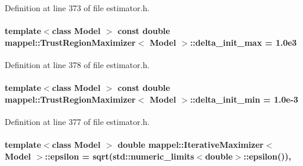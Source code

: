 Definition at line 373 of file estimator.\+h.

\paragraph[{\texorpdfstring{delta\+\_\+init\+\_\+max}{delta_init_max}}]{\setlength{\rightskip}{0pt plus 5cm}template$<$class Model $>$ const double {\bf mappel\+::\+Trust\+Region\+Maximizer}$<$ Model $>$\+::delta\+\_\+init\+\_\+max = 1.\+0e3\hspace{0.3cm}{\ttfamily [static]}}\hypertarget{classmappel_1_1TrustRegionMaximizer_aeb2067e81b002a0fb1e99ce32794f394}{}\label{classmappel_1_1TrustRegionMaximizer_aeb2067e81b002a0fb1e99ce32794f394}


Definition at line 378 of file estimator.\+h.

\paragraph[{\texorpdfstring{delta\+\_\+init\+\_\+min}{delta_init_min}}]{\setlength{\rightskip}{0pt plus 5cm}template$<$class Model $>$ const double {\bf mappel\+::\+Trust\+Region\+Maximizer}$<$ Model $>$\+::delta\+\_\+init\+\_\+min = 1.\+0e-\/3\hspace{0.3cm}{\ttfamily [static]}}\hypertarget{classmappel_1_1TrustRegionMaximizer_aa3a14bfa1f848f3dbe2472bc82623e05}{}\label{classmappel_1_1TrustRegionMaximizer_aa3a14bfa1f848f3dbe2472bc82623e05}


Definition at line 377 of file estimator.\+h.

\paragraph[{\texorpdfstring{epsilon}{epsilon}}]{\setlength{\rightskip}{0pt plus 5cm}template$<$class Model $>$ double {\bf mappel\+::\+Iterative\+Maximizer}$<$ Model $>$\+::epsilon = sqrt(std\+::numeric\+\_\+limits$<$double$>$\+::epsilon())\hspace{0.3cm}{\ttfamily [protected]}, {\ttfamily [inherited]}}\hypertarget{classmappel_1_1IterativeMaximizer_ae727ea0e3cab3924d21ebe9c12fec314}{}\label{classmappel_1_1IterativeMaximizer_ae727ea0e3cab3924d21ebe9c12fec314}


